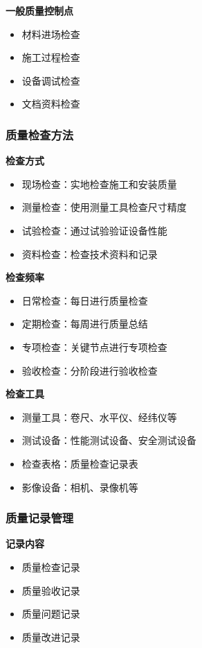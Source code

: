 \documentclass[UTF8,a4paper,zihao=-4]{ctexart}
\begin{document}
\textbf{一般质量控制点}
\begin{itemize}
    \item 材料进场检查
    \item 施工过程检查
    \item 设备调试检查
    \item 文档资料检查
\end{itemize}

\subsubsection{质量检查方法}
\textbf{检查方式}
\begin{itemize}
    \item 现场检查：实地检查施工和安装质量
    \item 测量检查：使用测量工具检查尺寸精度
    \item 试验检查：通过试验验证设备性能
    \item 资料检查：检查技术资料和记录
\end{itemize}

\textbf{检查频率}
\begin{itemize}
    \item 日常检查：每日进行质量检查
    \item 定期检查：每周进行质量总结
    \item 专项检查：关键节点进行专项检查
    \item 验收检查：分阶段进行验收检查
\end{itemize}

\textbf{检查工具}
\begin{itemize}
    \item 测量工具：卷尺、水平仪、经纬仪等
    \item 测试设备：性能测试设备、安全测试设备
    \item 检查表格：质量检查记录表
    \item 影像设备：相机、录像机等
\end{itemize}

\subsubsection{质量记录管理}
\textbf{记录内容}
\begin{itemize}
    \item 质量检查记录
    \item 质量验收记录
    \item 质量问题记录
    \item 质量改进记录
\end{itemize}
\end{document}
